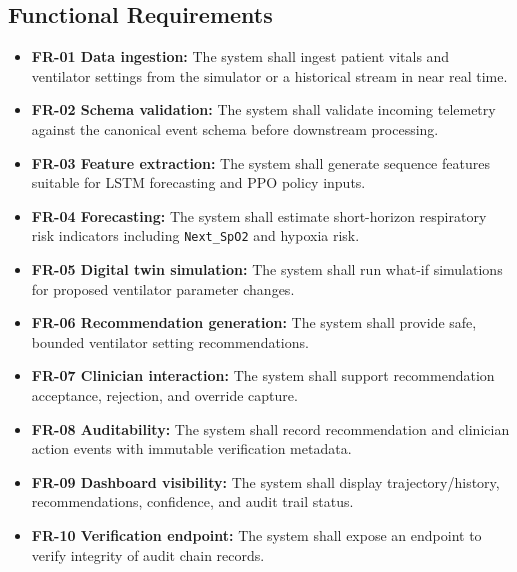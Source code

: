 \documentclass[12pt,a4paper,oneside]{report}
\begin{document}
\subsection{Functional Requirements}
\begin{itemize}[leftmargin=*]
  \item \textbf{FR-01 Data ingestion:} The system shall ingest patient vitals and ventilator settings from the simulator or a historical stream in near real time.
  \item \textbf{FR-02 Schema validation:} The system shall validate incoming telemetry against the canonical event schema before downstream processing.
  \item \textbf{FR-03 Feature extraction:} The system shall generate sequence features suitable for LSTM forecasting and PPO policy inputs.
  \item \textbf{FR-04 Forecasting:} The system shall estimate short-horizon respiratory risk indicators including \texttt{Next\_SpO2} and hypoxia risk.
  \item \textbf{FR-05 Digital twin simulation:} The system shall run what-if simulations for proposed ventilator parameter changes.
  \item \textbf{FR-06 Recommendation generation:} The system shall provide safe, bounded ventilator setting recommendations.
  \item \textbf{FR-07 Clinician interaction:} The system shall support recommendation acceptance, rejection, and override capture.
  \item \textbf{FR-08 Auditability:} The system shall record recommendation and clinician action events with immutable verification metadata.
  \item \textbf{FR-09 Dashboard visibility:} The system shall display trajectory/history, recommendations, confidence, and audit trail status.
  \item \textbf{FR-10 Verification endpoint:} The system shall expose an endpoint to verify integrity of audit chain records.
\end{itemize}
\end{document}
